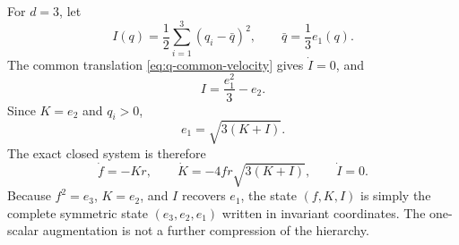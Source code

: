 For $d=3$, let
\begin{equation}
  I(q)=\frac12\sum_{i=1}^3(q_i-\bar q)^2,
  \qquad
  \bar q=\frac13e_1(q).
  \label{eq:I}
\end{equation}
The common translation \eqref{eq:q-common-velocity} gives $\dot I=0$, and
\begin{equation}
  I=\frac{e_1^2}{3}-e_2.
  \label{eq:I-identity}
\end{equation}
Since $K=e_2$ and $q_i>0$,
\begin{equation}
  e_1=\sqrt{3(K+I)}.
\end{equation}
The exact closed system is therefore
\begin{equation}
  \boxed{
  \dot f=-Kr,
  \qquad
  \dot K=-4fr\sqrt{3(K+I)},
  \qquad
  \dot I=0.}
  \label{eq:depth-three-closure}
\end{equation}
Because $f^2=e_3$, $K=e_2$, and $I$ recovers $e_1$, the state $(f,K,I)$ is simply the complete symmetric state $(e_3,e_2,e_1)$ written in invariant coordinates.  The one-scalar augmentation is not a further compression of the hierarchy.
